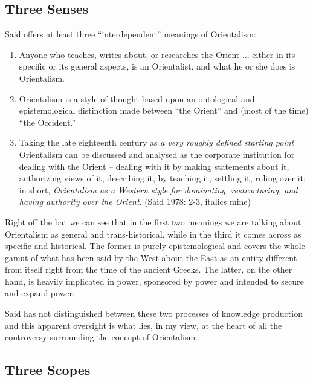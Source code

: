 \subsection*{Three Senses}

Said offers at least three “interdependent” meanings of Orientalism:
{\eleven
\renewcommand\theenumi{\alph{enumi}}
\renewcommand\labelenumi{(\theenumi)}
\begin{enumerate}
\itemsep=0pt
\item Anyone who teaches, writes about, or researches the Orient $\ldots$ either in its specific or its general aspects, is an Orientalist, and what he or she does is Orientalism.
\item Orientalism is a style of thought based upon an ontological and epistemological distinction made between “the Orient” and (most of the time) “the Occident.”
\item Taking the late eighteenth century as {\sl a very roughly defined starting point} Orientalism can be discussed and analysed as the corporate institution for dealing with the Orient – dealing with it by making statements about it, authorizing views of it, describing it, by teaching it, settling it, ruling over it: in short, {\sl Orientalism as a Western style for dominating, restructuring, and having authority over the Orient}. (Said 1978: 2-3, italics mine)
\end{enumerate}}
Right off the bat we can see that in the first two meanings we are talking about Orientalism as general and trans-historical, while in the third it comes across as specific and historical. The former is purely epistemological and covers the whole gamut of what has been said by the West about the East as an entity different from itself right from the time of the ancient Greeks. The latter, on the other hand, is heavily implicated in power, sponsored by power and intended to secure and expand power. 

Said has not distinguished between these two processes of knowledge production and this apparent oversight is what lies, in my view, at the heart of all the controversy surrounding the concept of Orientalism. 

\subsection*{Three Scopes}


